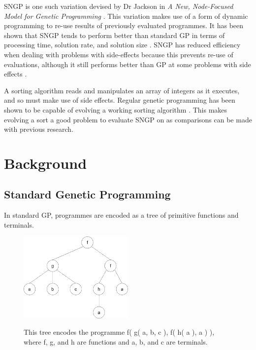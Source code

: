 \documentclass{article}
\begin{document}
		SNGP is one such variation devised by Dr Jackson in \textit{A New, Node-Focused Model for Genetic Programming} \cite{jackson_new_2012}. This variation makes use of a form of dynamic programming to re-use results of previously evaluated programmes. It has been shown that SNGP tends to perform better than standard GP in terms of processing time, solution rate, and solution size \cite{jackson_new_2012}. SNGP has reduced efficiency when dealing with problems with side-effects because this prevents re-use of evaluations, although it still performs better than GP at some problems with side effects \cite{jackson_single_2012}. 
		
		A sorting algorithm reads and manipulates an array of integers as it executes, and so must make use of side effects. Regular genetic programming has been shown to be capable of evolving a working sorting algorithm \cite{kinnear_evolving_1993,kinnear_generality_1993}. This makes evolving a sort a good problem to evaluate SNGP on as comparisons can be made with previous research.
	
	\section{Background}
	
		\subsection{Standard Genetic Programming}
		
			In standard GP, programmes are encoded as a tree of primitive functions and terminals.
			
			\begin{figure}[H]
				\centering
				\includegraphics[width=0.5\textwidth]{1_gp_example_tree}
				\label{fig:ex_prog_tree}
				\caption{This tree encodes the programme f( g( a, b, c ), f( h( a ), a ) ), where f, g, and h are functions and a, b, and c are terminals.}
			\end{figure}
			
\end{document}
